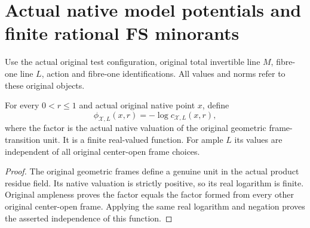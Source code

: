 \section{Actual native model potentials and finite rational FS minorants}

Use the actual original test configuration, original total invertible
line $M$, fibre-one line $L$, action and fibre-one identifications.
All values and norms refer to these original objects.

\begin{definition}\label{def:native-tc-original-model-potential}
\leanok
For every $0<r\leq1$ and actual original native point $x$, define
\[
 \phi_{\mathcal X,L}(x,r)=-\log c_{\mathcal X,L}(x,r),
\]
where the factor is the actual native valuation of the original
geometric frame-transition unit. It is a finite real-valued function.
For ample $L$ its values are independent of all original center-open
frame choices.
\end{definition}
\begin{proof}
The original geometric frames define a genuine unit in the actual
product residue field. Its native valuation is strictly positive,
so its real logarithm is finite. Original ampleness proves the
factor equals the factor formed from every other original
center-open frame. Applying the same real logarithm and negation
proves the asserted independence of this function.
\end{proof}

